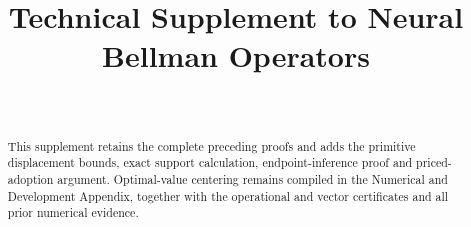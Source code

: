 \documentclass[ecta,nameyear,draft]{econsocart}
\begin{document}
\begin{frontmatter}
\title{Technical Supplement to Neural Bellman Operators}
\begin{aug}
\author[id=au1,addressref={add1}]{~}
\address[id=add1]{Peking University}
\end{aug}
\begin{abstract}
This supplement retains the complete preceding proofs and adds the primitive displacement bounds, exact support calculation, endpoint-inference proof and priced-adoption argument. Optimal-value centering remains compiled in the Numerical and Development Appendix, together with the operational and vector certificates and all prior numerical evidence.
\end{abstract}
\end{frontmatter}







\end{document}
